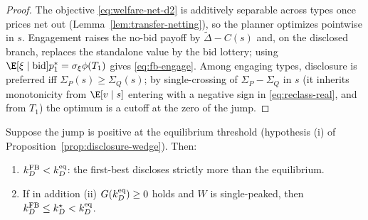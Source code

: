 \begin{proof}
The objective \eqref{eq:welfare-net-d2} is additively separable across types once
prices net out (Lemma~\ref{lem:transfer-netting}), so the planner optimizes
pointwise in $s$. Engagement raises the no-bid payoff by $\tilde\Delta-C(s)$ and,
on the disclosed branch, replaces the standalone value by the bid lottery; using
$\E[\xi\mid\text{bid}]p_1^{\ast}=\sigma_\xi\phi(T_1)$ gives \eqref{eq:fb-engage}.
Among engaging types, disclosure is preferred iff $\Sigma_P(s)\ge\Sigma_Q(s)$; by
single-crossing of $\Sigma_P-\Sigma_Q$ in $s$ (it inherits monotonicity from
$\E[v\mid s]$ entering with a negative sign in \eqref{eq:reclass-real}, and from
$T_1$) the optimum is a cutoff at the zero of the jump.
\end{proof}

\begin{corollary}
\label{cor:cons-vs-fb}
Suppose the jump is positive at the equilibrium threshold (hypothesis (i) of
Proposition~\ref{prop:disclosure-wedge}). Then:
\begin{enumerate}[label=\textup{(\alph*)},leftmargin=2em]
\item $k_D^{\textup{FB}}<k_D^{\textup{eq}}$: the first-best discloses strictly
more than the equilibrium.
\item If in addition (ii) $G(k_D^{\textup{eq}})\ge0$ holds and $W$ is
single-peaked, then $k_D^{\textup{FB}}\le k_D^{\star}<k_D^{\textup{eq}}$.
\end{enumerate}
\end{corollary}

